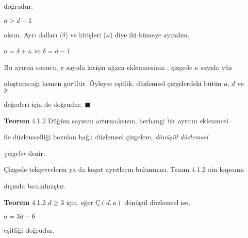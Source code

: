 \documentclass[11pt, twoside, a4paper]{article}
\numberwithin{equation}{section}
\numberwithin{figure}{section}
\begin{document}
doğrudur. \vspace{0.25cm}

\hspace{2cm} $a > d - 1$ \vspace{0.25cm}

olsun. Ayrı dalları ($ \delta $) ve kirişleri ($\kappa$) diye iki kümeye ayıralım, \vspace{0.25cm}

\hspace{2cm} $ a = \delta + \kappa$ \hspace{1cm} ve  \hspace{1cm} $\delta = d - 1  $ \vspace{0.25cm}

Bu ayırım sonucu, $\kappa$ sayıda kirişin ağaca eklenmesinin , çizgede $\kappa$ sayıda yüz \vspace{0.25cm}

oluşturacağı hemen görülür. Öyleyse eşitlik, düzlemsel çizgelerdeki bütün $a$, $d$ ve $y$  \vspace{0.25cm}

 değerleri için de doğrudur. $\blacksquare$  \vspace{0.25cm}

\textbf{Teorem} 4.1.2 Düğüm sayısını artırmaksızın, herhangi bir ayrıtın eklenmesi  \vspace{0.25cm}

\hspace{2.4cm} ile düzlemselliği bozulan bağlı düzlemsel çizgelere, \textit{dönüşül düzlemsel} \vspace{0.25cm}

\hspace{2.4cm} \textit{çizgeler} denir. \vspace{0.25cm}

Çizgede tekçevrelerin ya da koşut ayrıtların bulunması, Tanım 4.1.2 nin kapsamı \vspace{0.25cm}

dışında bırakılmıştır. \vspace{0.25cm}

\textbf{Teorem} 4.1.2 $d \ge 3$ için, eğer Ç$(d, a)$ dönüşül düzlemsel ise, \vspace{0.25cm}

\hspace{2.4cm} $a = 3d - 6$ \vspace{0.25cm}

\hspace{2.4cm} eşitliği doğrudur.
\end{document}
